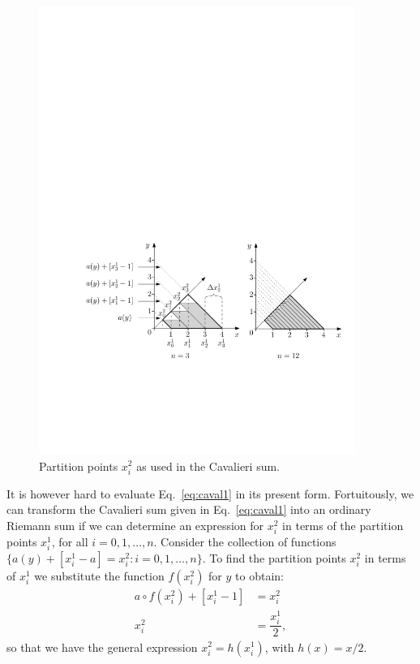 \documentclass{article}
\theoremstyle{theorem}
\theoremstyle{definition}
\begin{document}
\begin{figure}[htb]
\centering
\includegraphics[width=0.92\textwidth]{fig13}
\caption{Partition points $x_i^2$ as used in the Cavalieri sum.}
\label{fig:caval2}
\end{figure}

\noindent
It is however hard to evaluate Eq.~\eqref{eq:caval1} in its present form. Fortuitously, we can transform the Cavalieri sum given in Eq.~\eqref{eq:caval1} into an ordinary Riemann sum
if we can determine an expression for $x_i^2$ in terms of the partition points $x_i^1$, for all $i=0,1,\ldots,n$. Consider the collection of functions $\{a(y) + [x_i^1-a] = x_i^2: i=0,1,\ldots,n\}$. To find the partition points $x_i^2$ in terms of $x_i^1$ we substitute the function $f(x_i^2)$ for $y$ to obtain:
\begin{align*}
a\circ f (x_i^2)+[x_i^1-1] &= x_i^2\\
x_i^2 &= \dfrac{x_i^1}{2},
\end{align*}
so that we have the general expression $x_i^2=h(x_i^1)$, with $h(x)=x/2$.\\
\end{document}
